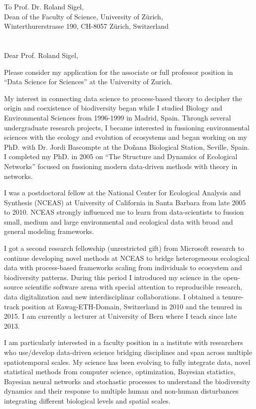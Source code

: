 \documentclass[a4paper,12pt]{letter}
\begin{document}
\vspace{-4 in}

To Prof. Dr. Roland Sigel,\\
Dean of the Faculty of Science, University of Z\"urich,\\
Winterthurerstrasse 190, CH-8057 Z\"urich, Switzerland\\
\\
\\
Dear Prof. Roland Sigel,\\
\vspace{0.05 in}

Please consider my application for the associate or full professor
position in ``Data Science for Sciences'' at the University of Zurich.

My interest in connecting data science to process-based theory to
decipher the origin and coexistence of biodiversity began while I
studied Biology and Environmental Sciences from 1996-1999 in Madrid,
Spain. Through several undergraduate research projects, I became
interested in fussioning environmental sciences with the ecology and
evolution of ecosystems and began working on my PhD. with Dr. Jordi
Bascompte at the Do\~nana Biological Station, Seville, Spain. I
completed my PhD. in 2005 on ``The Structure and Dynamics of
Ecological Networks'' focused on fussioning modern data-driven methods
with theory in networks.

I was a postdoctoral fellow at the National Center for Ecological
Analysis and Synthesis (NCEAS) at University of California in Santa
Barbara from late 2005 to 2010. NCEAS strongly influenced me to learn
from data-scientists to fussion small, medium and large environmental
and ecological data with broad and general modeling frameworks.

I got a second research fellowship (unrestricted gift) from Microsoft
research to continue developing novel methods at NCEAS to bridge
heterogeneous ecological data with process-based frameworks scaling
from individuals to ecosystem and biodiversity patterns. During this
period I introduced my science in the open-source scientific software
arena with special attention to reproducible research, data
digitalization and new interdisciplinar collaborations. I obtained a
tenure-track position at Eawag-ETH-Domain, Switzerland in 2010 and the
tenured in 2015. I am currently a lecturer at University of Bern where
I teach since late 2013.

I am particularly interested in a faculty position in a institute with
researchers who use/develop data-driven science bridging disciplines
and span across multiple spatiotemporal scales. My science has been
evolving to fully integrate data, novel statistical methods from
computer science, optimization, Bayesian statistics, Bayesian neural
networks and stochastic processes to understand the biodiversity
dynamics and their response to multiple human and non-human
disturbances integrating different biological levels and spatial
scales.
\end{document}
